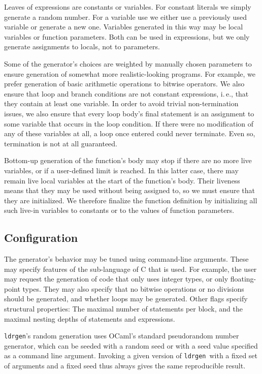 \documentclass{llncs}
\newcommand\ldrgen{\texttt{ldrgen}}
\begin{document}
Leaves of expressions are constants or variables. For constant literals we
simply generate a random number. For a variable use we either use a
previously used variable or generate a new one. Variables generated in
this way may be local variables or function parameters. Both can be used in
expressions, but we only generate assignments to locals, not to parameters.

Some of the generator's choices are weighted by manually chosen parameters
to ensure generation of somewhat more realistic-looking programs. For
example, we prefer generation of basic arithmetic operations to bitwise
operators. We also ensure that loop and branch conditions are not constant
expressions, i.\,e., that they contain at least one variable. In order to
avoid trivial non-termination issues, we also ensure that every loop body's
final statement is an assignment to some variable that occurs in the loop
condition. If there were no modification of any of these variables at all, a
loop once entered could never terminate. Even so, termination is not at all
guaranteed.

Bottom-up generation of the function's body may stop if there are no more
live variables, or if a user-defined limit is reached. In this
latter case, there may remain live local variables at the start of the
function's body. Their liveness means that they may be used without being
assigned to, so we must ensure that they are initialized. We therefore
finalize the function definition by initializing all such live-in variables
to constants or to the values of function parameters.

\subsection{Configuration}

The generator's behavior may be tuned using command-line arguments. These
may specify features of the sub-language of C that is used. For example, the
user may request the generation of code that only uses integer types, or
only floating-point types. They may also specify that no bitwise operations
or no divisions should be generated, and whether loops may be generated.
Other flags specify structural properties: The maximal number of statements
per block, and the maximal nesting depths of statements and expressions.

\ldrgen's random generation uses OCaml's standard pseudorandom number
generator, which can be seeded with a random seed or with a seed value
specified as a command line argument. Invoking a given version of \ldrgen\
with a fixed set of arguments and a fixed seed thus always gives the same
reproducible result.
\end{document}
